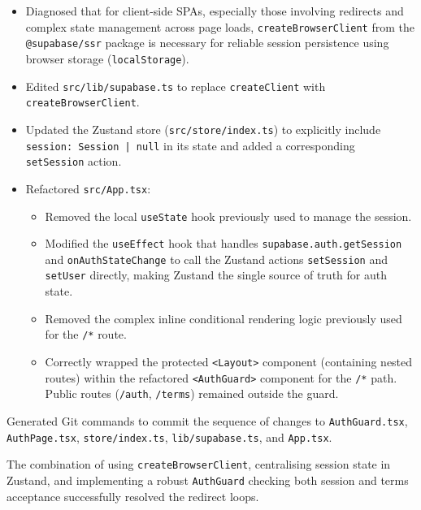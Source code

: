\documentclass[11pt]{article} %
\begin{document}
\begin{description}[style=unboxed,leftmargin=0pt]
\begin{itemize}
             \item Diagnosed that for client-side SPAs, especially those involving redirects and complex state management across page loads, \texttt{createBrowserClient} from the \texttt{@supabase/ssr} package is necessary for reliable session persistence using browser storage (\texttt{localStorage}).
             \item Edited \texttt{src/lib/supabase.ts} to replace \texttt{createClient} with \texttt{createBrowserClient}.
        \end{itemize}
     \item[AI Assistance (Centralising State Management):]
         \begin{itemize}
             \item Updated the Zustand store (\texttt{src/store/index.ts}) to explicitly include \texttt{session: Session | null} in its state and added a corresponding \texttt{setSession} action.
             \item Refactored \texttt{src/App.tsx}:
                \begin{itemize}
                    \item Removed the local \texttt{useState} hook previously used to manage the session.
                    \item Modified the \texttt{useEffect} hook that handles \texttt{supabase.auth.getSession} and \texttt{onAuthStateChange} to call the Zustand actions \texttt{setSession} and \texttt{setUser} directly, making Zustand the single source of truth for auth state.
                    \item Removed the complex inline conditional rendering logic previously used for the \texttt{/*} route.
                    \item Correctly wrapped the protected \texttt{<Layout>} component (containing nested routes) within the refactored \texttt{<AuthGuard>} component for the \texttt{/*} path. Public routes (\texttt{/auth}, \texttt{/terms}) remained outside the guard.
               \end{itemize}
        \end{itemize}
    \item[AI Assistance (Committing Changes):] Generated Git commands to commit the sequence of changes to \texttt{AuthGuard.tsx}, \texttt{AuthPage.tsx}, \texttt{store/index.ts}, \texttt{lib/supabase.ts}, and \texttt{App.tsx}.
    \item[Outcome:] The combination of using \texttt{createBrowserClient}, centralising session state in Zustand, and implementing a robust \texttt{AuthGuard} checking both session and terms acceptance successfully resolved the redirect loops.
\end{description}
\end{document}
